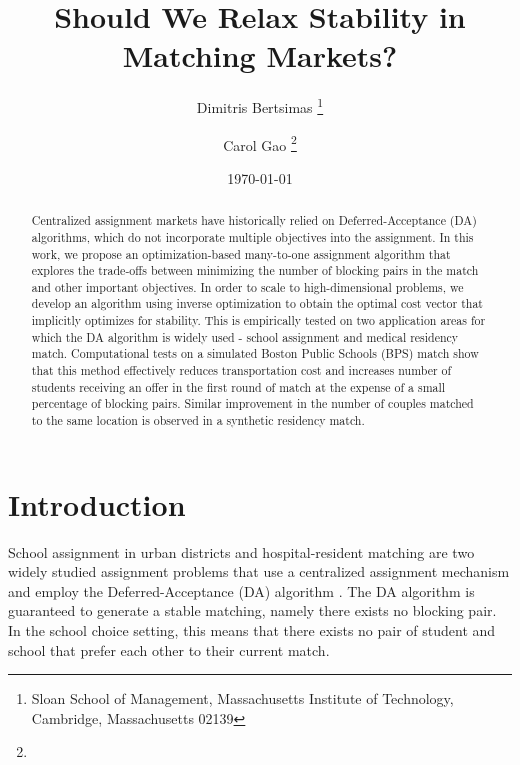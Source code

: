 \documentclass[11pt]{article}
\title{Should We Relax Stability in Matching Markets?}
\author{Dimitris Bertsimas \thanks{Sloan School of Management, Massachusetts Institute of Technology, Cambridge, Massachusetts 02139} \and Carol Gao \thanks{\orc} 
  }\date{\today}
\begin{document}
\setlength{\abovedisplayskip}{8pt}
\setlength{\belowdisplayskip}{8pt}

\maketitle

\begin{abstract}
    Centralized assignment markets have historically relied on Deferred-Acceptance (DA) algorithms, which do not  incorporate multiple objectives into the assignment. In this work, we propose an optimization-based many-to-one assignment algorithm that explores the trade-offs between minimizing the number of blocking pairs in the match and other important objectives. In order to scale to high-dimensional problems, we develop an algorithm using inverse optimization to obtain the optimal cost vector that implicitly optimizes for stability. This is empirically tested on two application areas for which the DA algorithm is widely used - school assignment and medical residency match. Computational tests on a simulated Boston Public Schools (BPS) match show that this method effectively reduces transportation cost and increases number of students receiving an offer in the first round of match at the expense of a small percentage of blocking pairs. Similar improvement in the number of couples matched to the same location is observed in a synthetic residency match.
\end{abstract}

\newpage
\section{Introduction}
School assignment in urban districts and hospital-resident matching are two widely studied assignment problems that use a centralized assignment mechanism and employ the Deferred-Acceptance (DA) algorithm \citep{roth2008}. %
The DA algorithm is guaranteed to generate a stable matching, namely there exists no blocking pair. In the school choice setting, this means that there exists no pair of student and school that prefer each other to their current match. 
\end{document}
